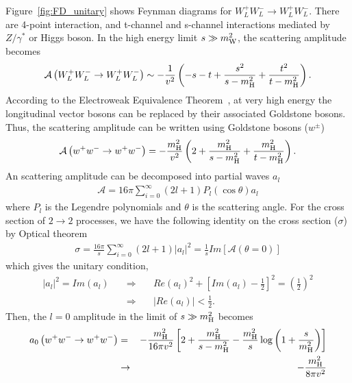 Figure~\ref{fig:FD_unitary} shows Feynman diagrams for $W_L^+W_L^- \to W_L^+W_L^-$. 
There are 4-point interaction, and t-channel and s-channel interactions mediated 
by $Z/\gamma^*$ or Higgs boson.
In the high energy limit $s \gg m_{\mathrm{W}}^2$, the scattering amplitude becomes \cite{Djouadi20081} 
\begin{eqnarray} 
\label{eq:WWscat}
\mathcal{A}\left( W_L^+W_L^- \to W_L^+W_L^- \right) 
\sim 
- \frac{1}{v^2}  \left( -s - t + \frac{s^2}{s - m_{\mathrm{H}}^2} + \frac{t^2}{t - m_{\mathrm{H}}^2} \right). 
\end{eqnarray} 
According to the Electroweak Equivalence Theorem~\cite{He:1994br},  
at very high energy the longitudinal vector bosons can be replaced by 
their associated Goldstone bosons. Thus, the scattering amplitude can be written 
using Goldstone bosons ($w^\pm$)
\begin{eqnarray} 
\mathcal{A}\left( w^+w^- \to w^+w^- \right) 
= 
- \frac{m_{\mathrm{H}}^2}{v^2}  \left( 2 + \frac{m_{\mathrm{H}}^2}{s - m_{\mathrm{H}}^2} + \frac{m_{\mathrm{H}}^2}{t - m_{\mathrm{H}}^2} \right). 
\end{eqnarray} 
An scattering amplitude can be decomposed into partial waves $a_l$
\begin{eqnarray} 
\mathcal{A} = 16 \pi \sum_{i=0}^\infty 
              \left( 2l+1 \right) P_l \left( \cos \theta \right) a_l
\end{eqnarray} 
where $P_l$ is the Legendre polynomials and $\theta$ is the scattering angle.
For the cross section of $2 \to 2$ processes, we have the 
following identity on the cross section ($\sigma$) by Optical theorem \cite{optical}
\begin{eqnarray} 
\sigma 
= \frac{16 \pi}{s} \sum_{i=0}^\infty  \left( 2l+1 \right) \left| a_l \right|^2 
= \frac{1}{s} Im \left[ \mathcal{A} \left(\theta = 0 \right)  \right]
\end{eqnarray} 
which gives the unitary condition, 
\begin{eqnarray} 
\left| a_l \right|^2 = Im \left( a_l \right) 
\quad &\Rightarrow& \quad  
Re\left( a_l \right)^2 
+ \left[ Im\left( a_l \right)  - \frac{1}{2} \right]^2 
= \left( \frac{1}{2} \right)^2 \\
\label{eq:unitaryWW}
\quad &\Rightarrow& \quad 
\left| Re \left( a_l \right) \right| < \frac{1}{2}.   
\end{eqnarray} 
Then, the $l=0$ amplitude in the limit of $ s \gg m_{\mathrm{H}}^2$ becomes  
\begin{eqnarray} 
a_0\left( w^+w^- \to w^+w^- \right)  
&=&  
- \frac{m_{\mathrm{H}}^2}{16\pi v^2}  
\left[ 2 + \frac{m_{\mathrm{H}}^2}{s - m_{\mathrm{H}}^2} 
       - \frac{m_{\mathrm{H}}^2}{s} \log \left( 1 + \frac{s}{m_{\mathrm{H}}^2} \right) \right]  \\
&\rightarrow&
- \frac{m_{\mathrm{H}}^2}{8\pi v^2} 
\end{eqnarray} 
